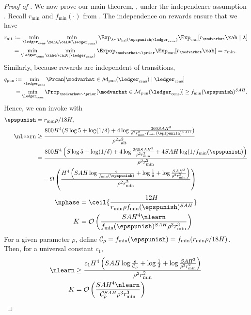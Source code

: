 \begin{proof}[Proof of ] We now prove our main theorem, , under the independence assumption . Recall $r_{\min}$ and $f_{\min}(\cdot)$ from . The independence on rewards ensure that we have
\begin{align}
\ralt &:= \min_{\ledcens}\min_{\xah \in \calU(\ledcens)}\Exp_{\lambda \sim \Dhalnol(\epspunish;\ledcens)}\Expcan[ r_{\modvarhat}\xah \mid \lambda ]\\
&= \min_{\ledcens}\min_{\xah \in \calU(\ledcens)}\Expop_{\modvarhat \sim \prior}\Expcan[ r_{\modvarhat}\xah ] = r_{\min}.
\end{align}
Similarly, because rewards are independent of transitions,
\begin{align}
\qpunish &:= \min_{\ledcens}\Prcan[\modvarhat \in \modpunish(\ledcens) \mid \ledcens]\\
&= \min_{\ledcens}\Prop_{\modvarhat \sim \prior}[\modvarhat \in \modpunish(\ledcens)] \ge f_{\min}(\epspunish)^{SAH}.
\end{align}
Hence, we can invoke  with
\begin{align*}
\epspunish &= r_{\min} \rho/18 H, \\
\nlearn &\ge  \frac{800 H^4 (S\log 5 + \log(1/\delta) +  4\log \frac{360 SAH^3 }{\rho^2 r_{\min}^2 \cdot f_{\min}(\epspunish)^{SAH} })}{\rho^2 \ralt^2}\\
&= \frac{800 H^4 \left(S\log 5 + \log(1/\delta) +  4\log \frac{360 SAH^3 }{\rho^2 r_{\min}^2} + 4 SAH \log(1/ f_{\min}(\epspunish)\right)}{\rho^2 r_{\min}^2}\\
&\quad= \Omega\left(\frac{ H^4 \left( SAH \log \tfrac{e}{f_{\min}(\epspunish)} +  \log \tfrac{1}{\delta} +  \log \tfrac{ SAH^3 }{\rho^2 r_{\min}^2}  \right)}{\rho^2 r_{\min}^2}\right)\\
\end{align*}
\begin{align*}
\nphase &= \ceil{\frac{12H}{r_{\min}\rho f_{\min}(\epspunish)^{SAH}}}\\
K &= \mathcal{O}\left(\frac{SAH^4 \nlearn}{f_{\min}(\epspunish)^{SAH}\rho^3 r_{\min}^3}\right)
\end{align*}
For a given parameter $\rho$, define $\mathcal{C}_{\rho} = f_{\min}(\epspunish) = f_{\min}(r_{\min} \rho/18 H)$. Then, for a universal constant $c_1$,
\begin{align}
\nlearn &\ge \frac{ c_1 H^4 \left( SAH \log \tfrac{e}{\mathcal{C}_{\rho}} +  \log \tfrac{1}{\delta} +  \log \tfrac{ SAH^3 }{\rho^2 r_{\min}^2}  \right)}{\rho^2 r_{\min}^2}\\
K &= \mathcal{O}\left(\frac{SAH^4 \nlearn}{\mathcal{C}_{\rho}^{SAH}\rho^3 r_{\min}^3}\right)
\end{align}

\end{proof}


